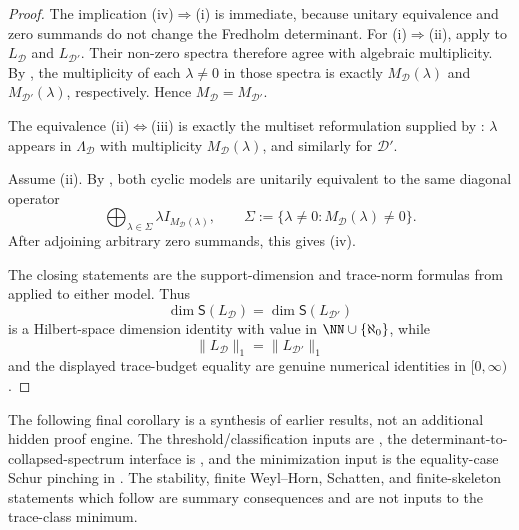 \begin{proof}
  The implication \textup{(iv)}\(\Rightarrow\)\textup{(i)} is immediate,
  because unitary equivalence and zero summands do not change the Fredholm
  determinant. For \textup{(i)}\(\Rightarrow\)\textup{(ii)}, apply
   to \(L_{\mathcal D}\) and
  \(L_{\mathcal D'}\). Their non-zero spectra therefore agree with
  algebraic multiplicity. By
  , the multiplicity of each
  \(\lambda\neq0\) in those spectra is exactly
  \(M_{\mathcal D}(\lambda)\) and \(M_{\mathcal D'}(\lambda)\),
  respectively. Hence \(M_{\mathcal D}=M_{\mathcal D'}\).

  The equivalence
  \textup{(ii)}\(\Leftrightarrow\)\textup{(iii)} is exactly the multiset
  reformulation supplied by
  : \(\lambda\) appears in
  \(\Lambda_{\mathcal D}\) with multiplicity \(M_{\mathcal D}(\lambda)\),
  and similarly for \(\mathcal D'\).

  Assume \textup{(ii)}. By
  , both cyclic models are
  unitarily equivalent to the same diagonal operator
  \[
    \bigoplus_{\lambda\in\Sigma}\lambda I_{M_{\mathcal D}(\lambda)},
    \qquad
    \Sigma:=\{\lambda\neq0:M_{\mathcal D}(\lambda)\neq0\}.
  \]
  After adjoining arbitrary zero summands, this gives \textup{(iv)}.

  The closing statements are the support-dimension and trace-norm formulas
  from  applied to either
  model. Thus
  \[
    \dim \mathsf S(L_{\mathcal D})=\dim \mathsf S(L_{\mathcal D'})
  \]
  is a Hilbert-space dimension identity with value in
  \(\NN\cup\{\aleph_0\}\), while
  \[
    \|L_{\mathcal D}\|_1=\|L_{\mathcal D'}\|_1
  \]
  and the displayed trace-budget equality are genuine numerical identities
  in \([0,\infty)\).
\end{proof}


The following final corollary is a synthesis of earlier results, not an
additional hidden proof engine.  The threshold/classification inputs are
,
the determinant-to-collapsed-spectrum interface is
,
and the minimization input is the equality-case Schur pinching in
. The stability, finite
Weyl--Horn, Schatten, and finite-skeleton statements which follow are summary
consequences and are not inputs to the trace-class minimum.

